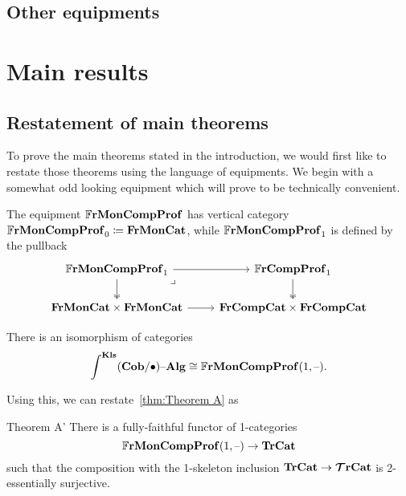 \documentclass[12pt,oneside,article,draft]{memoir}
\begin{document}
\section{Other equipments}

\chapter{Main results}

\section{Restatement of main theorems}

To prove the main theorems stated in the introduction, we would first like to restate those theorems
using the language of equipments. We begin with a somewhat odd looking equipment which will prove to
be technically convenient.

\begin{definition}
   The equipment $\mathbb{F}\mathbf{rMonCompProf}$ has vertical category $\mathbb{F}\mathbf{rMonCompProf}_0\coloneqq \mathbf{FrMonCat}$,
   while $\mathbb{F}\mathbf{rMonCompProf}_1$ is defined by the pullback
   \begin{equation*}
      \begin{tikzcd}
         \dFrMonCompProf_1 \ar[r] \ar[d,two heads] \ar[dr,phantom,"\lrcorner" very near start]
            & \dFrCompProf_1 \ar[d,two heads] \\
         \FrMonCat\times\FrMonCat \ar[r]
            & \FrCompCat \times \FrCompCat
      \end{tikzcd}
   \end{equation*}
\end{definition}

\begin{proposition}
   There is an isomorphism of categories
   \begin{equation*}
      \int^{\mathbf{Kls}}(\mathbf{Cob}/\bullet){\text \textendash}\mathbf{Alg}\cong\mathbb{F}\mathbf{rMonCompProf}(1,\textrm{--}).
   \end{equation*}
\end{proposition}

Using this, we can restate~\ref{thm:Theorem A} as

\begin{named}{Theorem A'}
   There is a fully-faithful functor of 1-categories
   \begin{equation*}
      \mathbb{F}\mathbf{rMonCompProf}(1,\textrm{--})\to\mathbf{TrCat}
   \end{equation*}
   such that the composition with the 1-skeleton inclusion $\mathbf{TrCat}\to\bm{\mathcal{T}}\mathbf{rCat}$ is 2-essentially
   surjective.
\end{named}
\end{document}
